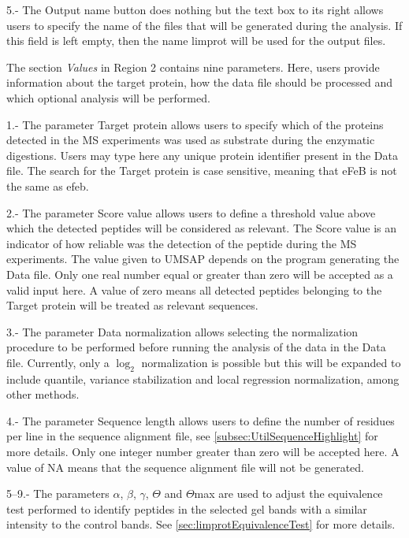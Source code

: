 \num{5}.- The Output name button does nothing but the text box to its right allows users to specify the name of the files that will be generated during the analysis. If this field is left empty, then the name limprot will be used for the output files. 

The section \textit{Values} in Region \num{2} contains nine parameters. Here, users provide information about the target protein, how the data file should be processed and which optional analysis will be performed.

\num{1}.- The parameter Target protein\label{par:limprotTargetProtein} allows users to specify which of the proteins detected in the MS experiments was used as substrate during the enzymatic digestions. Users may type here any unique protein identifier present in the Data file. The search for the Target protein is case sensitive, meaning that eFeB is not the same as efeb.

\num{2}.- The parameter Score value\label{par:limprotScoreValue} allows users to define a threshold value above which the detected peptides will be considered as relevant. The Score value is an indicator of how reliable was the detection of the peptide during the MS experiments. The value given to UMSAP depends on the program generating the Data file. Only one real number equal or greater than zero will be accepted as a valid input here. A value of zero means all detected peptides belonging to the Target protein will be treated as relevant sequences.

\num{3}.- The parameter Data normalization allows selecting the normalization procedure to be performed before running the analysis of the data in the Data file. Currently, only a $\log_2$ normalization is possible but this will be expanded to include quantile, variance stabilization and local regression normalization, among other methods. 

\num{4}.- The parameter Sequence length\label{par:enzdigSeqL} allows users to define the number of residues per line in the sequence alignment file, see \autoref{subsec:UtilSequenceHighlight} for more details. Only one integer number greater than zero will be accepted here. A value of NA means that the sequence alignment file will not be generated.

\numrange[range-phrase = --]{5}{9}.- The parameters $\alpha$, $\beta$, $\gamma$, $\Theta$ and $\Theta$max are used to adjust the equivalence test\cite{Limentani2005} performed to identify peptides in the selected gel bands with a similar intensity to the control bands. See \autoref{sec:limprotEquivalenceTest} for more details.

